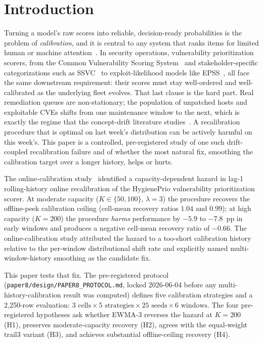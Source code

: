 \section{Introduction}

Turning a model's raw scores into reliable, decision-ready
probabilities is the problem of \emph{calibration}, and it is central
to any system that ranks items for limited human or machine
attention~\cite{guo2017calibration,niculescu2005predicting}. In
security operations, vulnerability prioritization scorers, from the
Common Vulnerability Scoring System~\cite{mell2007cvss} and
stakeholder-specific categorizations such as
SSVC~\cite{spring2021ssvc} to exploit-likelihood models like
EPSS~\cite{jacobs2021epss}, all face the same downstream requirement:
their scores must stay well-ordered and well-calibrated as the
underlying fleet evolves. That last clause is the hard part. Real
remediation queues are non-stationary; the population of unpatched
hosts and exploitable CVEs shifts from one maintenance window to the
next, which is exactly the regime that the concept-drift literature
studies~\cite{gama2014survey}. A recalibration procedure that is
optimal on last week's distribution can be actively harmful on this
week's. This paper is a controlled, pre-registered study of one such
drift-coupled recalibration failure and of whether the most natural
fix, smoothing the calibration target over a longer history, helps or
hurts.

The online-calibration study~\cite{paper7online} identified a capacity-dependent hazard
in lag-1 rolling-history online recalibration of the HygienePrio
vulnerability prioritization scorer. At moderate capacity
($K \in \{50, 100\}$, $\lambda = 3$) the procedure recovers the
offline-peek calibration ceiling (cell-mean recovery ratios
$1.04$ and $0.99$); at high capacity ($K = 200$) the procedure
\textit{harms} performance by $-5.9$ to $-7.8$~pp in early windows
and produces a negative cell-mean recovery ratio of $-0.66$. The online-calibration study
attributed the hazard to a too-short calibration history relative to
the per-window distributional shift rate and explicitly named
multi-window-history smoothing as the candidate fix.

This paper tests that fix. The pre-registered protocol
(\texttt{paper8/design/PAPER8\_PROTOCOL.md}, locked 2026-06-04 before
any multi-history-calibration result was computed) defines five
calibration strategies and a 2{,}250-row evaluation:
$3 \text{ cells} \times 5 \text{ strategies} \times 25 \text{ seeds}
\times 6 \text{ windows}$. The four pre-registered hypotheses
ask whether EWMA-3 reverses the hazard at $K = 200$ (H1), preserves
moderate-capacity recovery (H2), agrees with the equal-weight
trail3 variant (H3), and achieves substantial offline-ceiling
recovery (H4).

